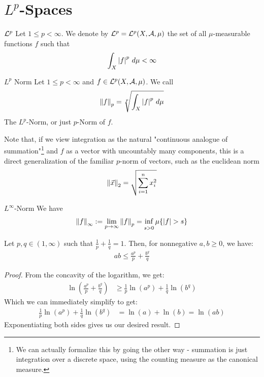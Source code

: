 \section{$L^p$-Spaces}
\begin{importantdefinition}{$\mathcal{L}^p$}{}
	Let $1 \leq p < \infty$. We denote by $\mathcal{L}^p = \mathcal{L}^p(X, \mathcal{A}, \mu)$ the set of all $\mu$-measurable functions $f$ such that
	\begin{align*}
		\int_X \abs{f}^p ~d\mu < \infty
	\end{align*}
\end{importantdefinition}
\begin{importantdefinition}{$L^p$ Norm}{}
	Let $1 \leq p < \infty$ and $f \in \mathcal{L}^p(X, \mathcal{A}, \mu)$. We call
	\begin{align*}
		\norm{f}_p = \sqrt[p]{\int_X \abs{f}^p ~d\mu}
	\end{align*}
	The $L^p$-Norm, or just $p$-Norm of $f$.
\end{importantdefinition}
Note that, if we view integration as the natural "continuous analogue of summation"\footnote{We can actually formalize this by going the other way - summation is just integration over a discrete space, using the counting measure as the canonical measure.} and $f$ as a vector with uncountably many components, this is a direct generalization of the familiar $p$-norm of vectors, such as the euclidean norm
\begin{align*}
	\norm{\vec{x}}_2 = \sqrt{\sum_{i = 1}^n x_i^2}
\end{align*}
\begin{importanttheorem}{$L^\infty$-Norm}{}
	We have
	\begin{align*}
		\norm{f}_\infty := \lim_{p \to \infty} \norm{f}_p = \inf_{s > 0} \mu\lr{\abs{f} > s}
	\end{align*}
\end{importanttheorem}
\begin{lemma}
	Let $p,q \in (1,\infty)$ such that $\frac{1}{p} + \frac{1}{q} = 1$. Then, for nonnegative $a,b \geq 0$, we have:
	\begin{align*}
		ab \leq \frac{a^p}{p} + \frac{b^q}{q}
	\end{align*}
\end{lemma}
\begin{proof}
	From the concavity of the logarithm, we get:
	\begin{align*}
		\ln(\frac{a^p}{p} + \frac{b^q}{q})
		&\geq
		\frac{1}{p} \ln(a^p) + \frac{1}{q} \ln(b^q)
	\end{align*}
	Which we can immediately simplify to get:
	\begin{align*}
		\frac{1}{p} \ln(a^p) + \frac{1}{q} \ln(b^q)
		&=
		\ln(a) + \ln(b)
		=
		\ln(ab)
	\end{align*}
	Exponentiating both sides gives us our desired result.
\end{proof}
